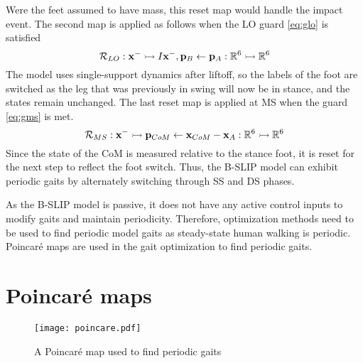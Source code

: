 Were the feet assumed to have mass, this reset map would handle the impact event. The second map is applied as follows when the LO guard \eqref{eq:glo} is satisfied
\begin{equation}
	\mathcal{R}_{LO}:\mathbf{x}^- \rightarrowtail I\mathbf{x}^- ,\mathbf{p}_B \leftarrow \mathbf{p}_A :\mathbb{R}^6 \rightarrowtail \mathbb{R}^6
\end{equation}
The model uses single-support dynamics after liftoff, so the labels of the foot are switched as the leg that was previously in swing will now be in stance, and the states remain unchanged. The last reset map is applied at MS when the guard \eqref{eq:gms} is met.
\begin{equation}
	\mathcal{R}_{MS}:\mathbf{x}^- \rightarrowtail \mathbf{p}_{CoM} \leftarrow \mathbf{x}_{CoM} - \mathbf{x}_A :\mathbb{R}^6 \rightarrowtail \mathbb{R}^6
\end{equation}
%
Since the state of the CoM is measured relative to the stance foot, it is reset for the next step to reflect the foot switch. Thus, the B-SLIP model can exhibit periodic gaits by alternately switching through SS and DS phases.

As the B-SLIP model is passive, it does not have any active control inputs to modify gaits and maintain periodicity. Therefore, optimization methods need to be used to find periodic model gaits as steady-state human walking is periodic. Poincar\'e maps are used in the gait optimization \cite{strogatz2018nonlinear,garcia1998simplest} to find periodic gaits.

\section{Poincar\'e maps}

\begin{figure}
	\centering
	\texttt{[image: poincare.pdf]}
	\caption{A Poincar\'e map used to find periodic gaits}\label{fig:poincare}
\end{figure}

